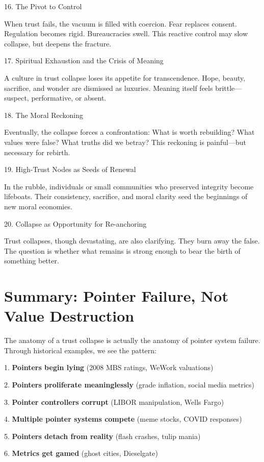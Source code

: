 \documentclass[11pt,oneside]{book}
\begin{document}
16. The Pivot to Control


When trust fails, the vacuum is filled with coercion. Fear replaces consent. Regulation becomes rigid. Bureaucracies swell. This reactive control may slow collapse, but deepens the fracture.

17. Spiritual Exhaustion and the Crisis of Meaning


A culture in trust collapse loses its appetite for transcendence. Hope, beauty, sacrifice, and wonder are dismissed as luxuries. Meaning itself feels brittle—suspect, performative, or absent.

18. The Moral Reckoning


Eventually, the collapse forces a confrontation: What is worth rebuilding? What values were false? What truths did we betray? This reckoning is painful—but necessary for rebirth.

19. High-Trust Nodes as Seeds of Renewal


In the rubble, individuals or small communities who preserved integrity become lifeboats. Their consistency, sacrifice, and moral clarity seed the beginnings of new moral economies.

20. Collapse as Opportunity for Re-anchoring


Trust collapses, though devastating, are also clarifying. They burn away the false. The question is whether what remains is strong enough to bear the birth of something better.

\section{Summary: Pointer Failure, Not Value Destruction}

The anatomy of a trust collapse is actually the anatomy of pointer system failure. Through historical examples, we see the pattern:


1. \textbf{Pointers begin lying} (2008 MBS ratings, WeWork valuations)


2. \textbf{Pointers proliferate meaninglessly} (grade inflation, social media metrics)


3. \textbf{Pointer controllers corrupt} (LIBOR manipulation, Wells Fargo)


4. \textbf{Multiple pointer systems compete} (meme stocks, COVID responses)


5. \textbf{Pointers detach from reality} (flash crashes, tulip mania)


6. \textbf{Metrics get gamed} (ghost cities, Dieselgate)
\end{document}
